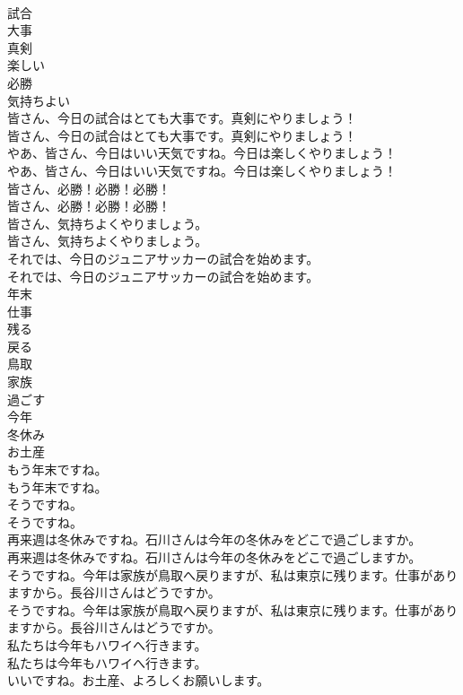 \documentclass[8pt]{extreport}
\begin{document}
\begin{CJK}{UTF8}{min}
\\	試合
\\	大事
\\	真剣
\\	楽しい
\\	必勝
\\	気持ちよい
\\	皆さん、今日の試合はとても大事です。真剣にやりましょう！	
\\	皆さん、今日の試合はとても大事です。真剣にやりましょう！ 
\\	やあ、皆さん、今日はいい天気ですね。今日は楽しくやりましょう！	
\\	やあ、皆さん、今日はいい天気ですね。今日は楽しくやりましょう！ 
\\	皆さん、必勝！必勝！必勝！	
\\	皆さん、必勝！必勝！必勝！ 
\\	皆さん、気持ちよくやりましょう。	
\\	皆さん、気持ちよくやりましょう。 
\\	それでは、今日のジュニアサッカーの試合を始めます。	
\\	それでは、今日のジュニアサッカーの試合を始めます。 
\\	年末
\\	仕事
\\	残る
\\	戻る
\\	鳥取
\\	家族
\\	過ごす
\\	今年
\\	冬休み
\\	お土産
\\	もう年末ですね。	
\\	もう年末ですね。 
\\	そうですね。	
\\	そうですね。 
\\	再来週は冬休みですね。石川さんは今年の冬休みをどこで過ごしますか。	
\\	再来週は冬休みですね。石川さんは今年の冬休みをどこで過ごしますか。 
\\	そうですね。今年は家族が鳥取へ戻りますが、私は東京に残ります。仕事がありますから。長谷川さんはどうですか。	
\\	そうですね。今年は家族が鳥取へ戻りますが、私は東京に残ります。仕事がありますから。長谷川さんはどうですか。 
\\	私たちは今年もハワイへ行きます。	
\\	私たちは今年もハワイへ行きます。 
\\	いいですね。お土産、よろしくお願いします。	

\end{CJK}
\end{document}
